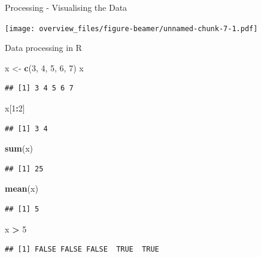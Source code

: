 \documentclass[ignorenonframetext,]{beamer}
\newenvironment{Shaded}{\begin{snugshade}}{\end{snugshade}}
\newcommand{\DecValTok}[1]{\textcolor[rgb]{0.00,0.00,0.81}{#1}}
\newcommand{\KeywordTok}[1]{\textcolor[rgb]{0.13,0.29,0.53}{\textbf{#1}}}
\newcommand{\NormalTok}[1]{#1}
\newcommand{\OperatorTok}[1]{\textcolor[rgb]{0.81,0.36,0.00}{\textbf{#1}}}
\newcommand{\StringTok}[1]{\textcolor[rgb]{0.31,0.60,0.02}{#1}}
\begin{document}
\begin{frame}{Processing - Visualising the Data}
\protect\hypertarget{processing---visualising-the-data}{}

\texttt{[image: overview\_files/figure-beamer/unnamed-chunk-7-1.pdf]}

\end{frame}

\begin{frame}[fragile]{Data processing in R}
\protect\hypertarget{data-processing-in-r}{}

\begin{Shaded}
\begin{Highlighting}[]
\NormalTok{x <-}\StringTok{ }\KeywordTok{c}\NormalTok{(}\DecValTok{3}\NormalTok{, }\DecValTok{4}\NormalTok{, }\DecValTok{5}\NormalTok{, }\DecValTok{6}\NormalTok{, }\DecValTok{7}\NormalTok{)}
\NormalTok{x}
\end{Highlighting}
\end{Shaded}

\begin{verbatim}
## [1] 3 4 5 6 7
\end{verbatim}

\begin{Shaded}
\begin{Highlighting}[]
\NormalTok{x[}\DecValTok{1}\OperatorTok{:}\DecValTok{2}\NormalTok{]}
\end{Highlighting}
\end{Shaded}

\begin{verbatim}
## [1] 3 4
\end{verbatim}

\begin{Shaded}
\begin{Highlighting}[]
\KeywordTok{sum}\NormalTok{(x)}
\end{Highlighting}
\end{Shaded}

\begin{verbatim}
## [1] 25
\end{verbatim}

\begin{Shaded}
\begin{Highlighting}[]
\KeywordTok{mean}\NormalTok{(x)}
\end{Highlighting}
\end{Shaded}

\begin{verbatim}
## [1] 5
\end{verbatim}

\begin{Shaded}
\begin{Highlighting}[]
\NormalTok{x }\OperatorTok{>}\StringTok{ }\DecValTok{5}
\end{Highlighting}
\end{Shaded}

\begin{verbatim}
## [1] FALSE FALSE FALSE  TRUE  TRUE
\end{verbatim}

\end{frame}
\end{document}
